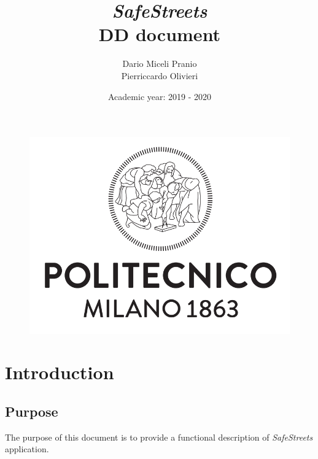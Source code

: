 \documentclass{article}
\title{
    \textbf{\textit{SafeStreets}} \\
    \textbf{DD document}}
\date{Academic year: 2019 - 2020}
\author{
    Dario Miceli Pranio \\
    Pierriccardo Olivieri
}
\begin{document}

\maketitle

\begin{figure}[h!]
    \centering
    \includegraphics[scale=0.5]{img/logo.png}
\end{figure}

\newpage
{}
\tableofcontents

\newpage
\section{Introduction}

\subsection{Purpose}
The purpose of this document is to provide a functional description of \textit{SafeStreets} application.
\end{document}
